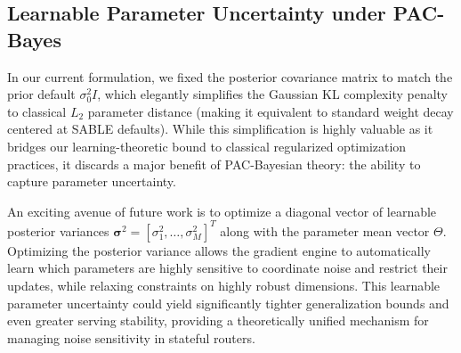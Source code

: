 \subsection{Learnable Parameter Uncertainty under PAC-Bayes}
In our current formulation, we fixed the posterior covariance matrix to match the prior default $\sigma_0^2 I$, which elegantly simplifies the Gaussian KL complexity penalty to classical $L_2$ parameter distance (making it equivalent to standard weight decay centered at SABLE defaults). While this simplification is highly valuable as it bridges our learning-theoretic bound to classical regularized optimization practices, it discards a major benefit of PAC-Bayesian theory: the ability to capture parameter uncertainty.

An exciting avenue of future work is to optimize a diagonal vector of learnable posterior variances $\boldsymbol{\sigma}^2 = [\sigma_1^2, \dots, \sigma_M^2]^T$ along with the parameter mean vector $\Theta$. Optimizing the posterior variance allows the gradient engine to automatically learn which parameters are highly sensitive to coordinate noise and restrict their updates, while relaxing constraints on highly robust dimensions. This learnable parameter uncertainty could yield significantly tighter generalization bounds and even greater serving stability, providing a theoretically unified mechanism for managing noise sensitivity in stateful routers.
